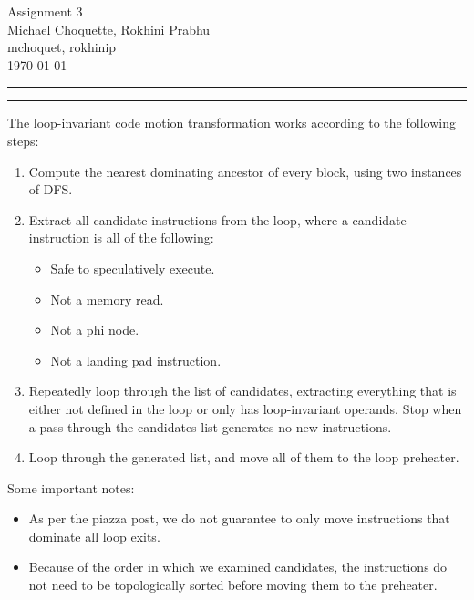 \documentclass[11pt]{article}
\newcounter{questionCounter}
\newcounter{partCounter}[questionCounter]
\newenvironment{question}[2][\arabic{questionCounter}]{%
    \setcounter{partCounter}{0}%
    \vspace{.25in} \hrule \vspace{0.5em}%
        \noindent{\bf #2}%
    \vspace{0.8em} \hrule \vspace{.10in}%
    \addtocounter{questionCounter}{1}%
}{}
\newcommand{\myname}{Michael Choquette, Rokhini Prabhu}
\newcommand{\myandrew}{mchoquet, rokhinip}
\newcommand{\myhwname}{Assignment 3}
\begin{document}
\thispagestyle{plain}

\begin{center}
{\Large \myhwname} \\
\myname \\
\myandrew \\
\today
\end{center}

\begin{question}{Implementation Notes}

The loop-invariant code motion transformation works according to the following steps:
\begin{enumerate}
\item	Compute the nearest dominating ancestor of every block, using two instances of DFS.
\item	Extract all candidate instructions from the loop, where a candidate instruction is all of the following:
	\begin{itemize}
	\item Safe to speculatively execute.
	\item Not a memory read.
	\item	Not a phi node.
	\item	Not a landing pad instruction.
	\end{itemize}
\item Repeatedly loop through the list of candidates, extracting everything that is either not defined in the loop or only has loop-invariant operands. Stop when a pass through the candidates list generates no new instructions.
\item Loop through the generated list, and move all of them to the loop preheater.
\end{enumerate}
Some important notes:
\begin{itemize}
\item	As per the piazza post, we do not guarantee to only move instructions that dominate all loop exits.
\item	Because of the order in which we examined candidates, the instructions do not need to be topologically sorted before moving them to the preheater.
\end{itemize}


\end{question}
\end{document}
